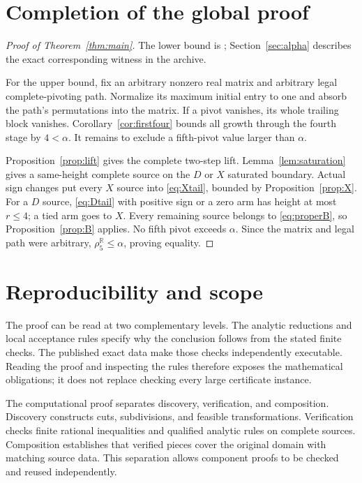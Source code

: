 \documentclass[11pt,reqno]{amsart}
\theoremstyle{definition}
\theoremstyle{remark}
\newcommand{\R}{\mathbb R}
\begin{document}
\section{Completion of the global proof}
\begin{proof}[Proof of Theorem~\ref{thm:main}]
The lower bound is \cite[Theorem~2.2]{ChenEdelmanUrschel2026};
Section~\ref{sec:alpha} describes the exact corresponding witness
in the archive.

For the upper bound, fix an arbitrary nonzero real matrix and
arbitrary legal complete-pivoting path. Normalize its maximum initial
entry to one and absorb the path's permutations into the matrix.
If a pivot vanishes, its whole trailing block vanishes.
Corollary~\ref{cor:firstfour} bounds all growth through the fourth
stage by \(4<\alpha\). It remains to exclude a fifth-pivot value
larger than \(\alpha\).

Proposition~\ref{prop:lift} gives the complete two-step lift.
Lemma~\ref{lem:saturation} gives a same-height complete source on
the \(D\) or \(X\) saturated boundary. Actual sign changes put every
\(X\) source into \eqref{eq:Xtail}, bounded by
Proposition~\ref{prop:X}.
For a \(D\) source, \eqref{eq:Dtail} with positive sign or a zero
arm has height at most \(r\le4\); a tied arm goes to \(X\).
Every remaining source belongs to \eqref{eq:properB}, so
Proposition~\ref{prop:B} applies.
No fifth pivot exceeds \(\alpha\).
Since the matrix and legal path were arbitrary,
\(\rho_5^\R\le\alpha\), proving equality.
\end{proof}

\section{Reproducibility and scope}\label{sec:reproducibility}
The proof can be read at two complementary levels. The analytic
reductions and local acceptance rules specify why the conclusion follows
from the stated finite checks. The published exact data make those
checks independently executable. Reading the proof and inspecting the
rules therefore exposes the mathematical obligations; it does not
replace checking every large certificate instance.

The computational proof separates discovery, verification, and
composition. Discovery constructs cuts, subdivisions, and feasible
transformations. Verification checks finite rational inequalities
and qualified analytic rules on complete sources. Composition
establishes that verified pieces cover the original domain with
matching source data. This separation allows component proofs to
be checked and reused independently.
\end{document}
